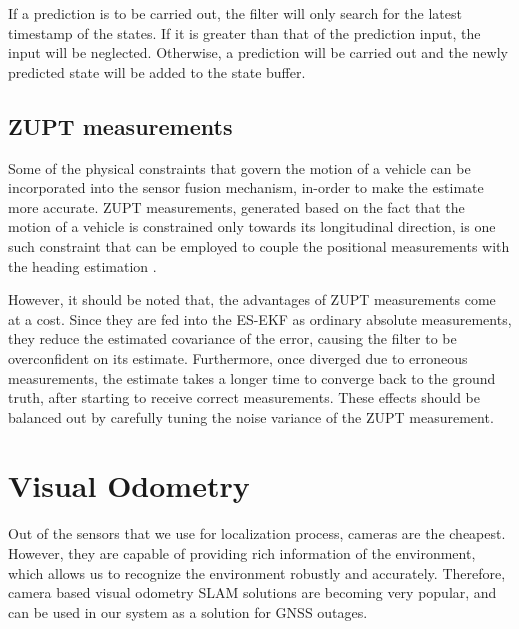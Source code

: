 If a prediction is to be carried out, the filter will only search for the latest timestamp of the states. If it is greater than that of the prediction input, the input will be neglected. Otherwise, a prediction will be carried out and the newly predicted state will be added to the state buffer.



\subsection{\acrlong{ZUPT} measurements}
Some of the physical constraints that govern the motion of a vehicle can be incorporated into the sensor fusion mechanism, in-order to make the estimate more accurate. \gls{ZUPT} measurements, generated based on the fact that the motion of a vehicle is constrained only towards its longitudinal direction, is one such constraint that can be employed to couple the positional measurements with the heading estimation \cite{pa:Dissanayake2001ZUPT}. 

However, it should be noted that, the advantages of \gls{ZUPT} measurements come at a cost. Since they are fed into the \gls{ES-EKF} as ordinary absolute measurements, they reduce the estimated covariance of the error, causing the filter to be overconfident on its estimate. Furthermore, once diverged due to erroneous measurements, the estimate takes a longer time to converge back to the ground truth, after starting to receive correct measurements. These effects should be balanced out by carefully tuning the noise variance of the \gls{ZUPT} measurement.







\section{Visual Odometry}
Out of the sensors that we use for localization process, cameras are the cheapest. However, they are capable of providing rich information of the environment, which allows us to recognize the environment robustly and accurately. Therefore, camera based visual odometry \gls{SLAM} solutions are becoming very popular, and can be used in our system as a solution for \gls{GNSS} outages. 

